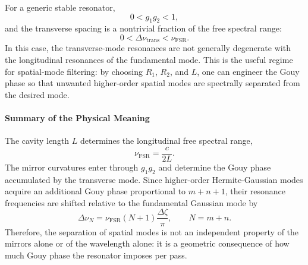 \begin{resolucao}[Solution]
\begin{itemize}
            For a generic stable resonator,
            \begin{equation}
                0<g_1g_2<1,
            \end{equation}
            and the transverse spacing is a nontrivial fraction of the free spectral range:
            \begin{equation}
                0<
                \Delta\nu_{\mathrm{trans}}
                <
                \nu_{\mathrm{FSR}}.
            \end{equation}
            In this case, the transverse-mode resonances are not generally degenerate with the longitudinal resonances of the fundamental mode. This is the useful regime for spatial-mode filtering: by choosing $R_1$, $R_2$, and $L$, one can engineer the Gouy phase so that unwanted higher-order spatial modes are spectrally separated from the desired mode.
        \end{itemize}

    \paragraph*{Summary of the Physical Meaning}
        The cavity length $L$ determines the longitudinal free spectral range,
        \[
            \nu_{\mathrm{FSR}}=\frac{c}{2L}.
        \]
        The mirror curvatures enter through $g_1g_2$ and determine the Gouy phase accumulated by the transverse mode. Since higher-order Hermite-Gaussian modes acquire an additional Gouy phase proportional to $m+n+1$, their resonance frequencies are shifted relative to the fundamental Gaussian mode by
        \begin{equation}
            \Delta\nu_N
            =
            \nu_{\mathrm{FSR}}
            (N+1)
            \frac{\Delta\zeta}{\pi},
            \qquad
            N=m+n.
        \end{equation}
        Therefore, the separation of spatial modes is not an independent property of the mirrors alone or of the wavelength alone: it is a geometric consequence of how much Gouy phase the resonator imposes per pass.

\end{resolucao}
